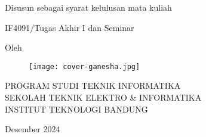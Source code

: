 \clearpage
\pagestyle{empty}

\begin{center}
    \smallskip

    \Large \bfseries \MakeUppercase{\thetitle}
    \vfill


    \large Disusun sebagai syarat kelulusan mata kuliah

    \large IF4091/Tugas Akhir I dan Seminar
    \vfill

    \large Oleh

    \Large \theauthor

    \vfill
    \begin{figure}[ht]
        \centering
        \texttt{[image: cover-ganesha.jpg]}
    \end{figure}
    \vfill

    \large
    \uppercase{
        Program Studi Teknik Informatika \\
        Sekolah Teknik Elektro \& Informatika \\
        Institut Teknologi Bandung
    }

    Desember 2024

\end{center}

\clearpage
